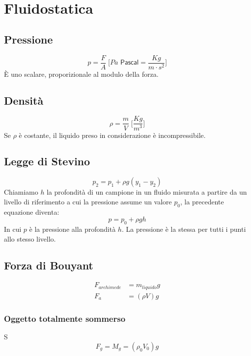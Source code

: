 \chapter*{Fluidostatica}

    \section*{Pressione} 
        \begin{equation*}
            p = \frac{F}{A} \; \Bigg[Pa \textsf{ Pascal} = \frac{Kg}{m \cdot 
            s^2} \Bigg]
        \end{equation*}
    È uno scalare, proporizionale al modulo della forza.

    \section*{Densità}
        \begin{equation*}
            \rho = \frac{m}{V} \; \Bigg[\frac{Kg}{m^3}\Bigg]
        \end{equation*}
    Se $\rho$ è costante, il liquido preso in considerazione è incompressibile.

    \section*{Legge di Stevino} 
        \begin{equation*}
            p_2 = p_1 + \rho g(y_1-y_2)
        \end{equation*}
    Chiamiamo $h$ la profondità di un campione in un fluido misurata a partire
    da un livello di riferimento a cui la pressione assume un valore $p_0$, la 
    precedente equazione diventa:
        \begin{equation*}
            p = p_0 + \rho gh
        \end{equation*}
    In cui $p$ è la pressione alla profondità $h$.
    La pressione è la stessa per tutti i punti allo stesso livello.

    \section*{Forza di Bouyant}
        \begin{align}
            F_{archimede} &= m_{liquido}g \\
            F_a &= (\rho V) g
        \end{align}
        \subsection*{Oggetto totalmente sommerso} S
            \begin{equation*}
                F_g = M_g = (\rho_0 V_0) g
            \end{equation*}


